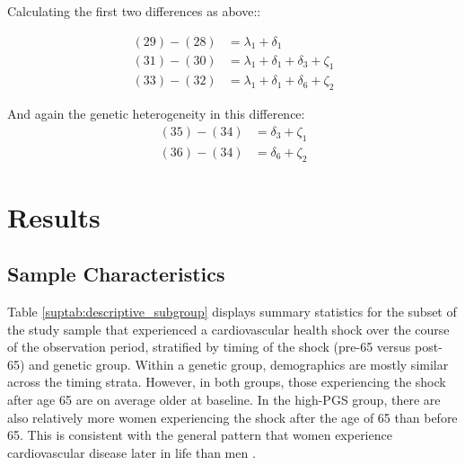 Calculating the first two differences as above::

\begin{align}
(29)-(28)&=\lambda_1+\delta_1\\
(31)-(30)&=\lambda_1+\delta_1+\delta_3+\zeta_1\\
(33)-(32)&=\lambda_1+\delta_1+\delta_6+\zeta_2
\end{align}

And again the genetic heterogeneity in this difference:
\begin{align}
(35)-(34)&=\delta_3+\zeta_1\\
(36)-(34)&=\delta_6+\zeta_2
\end{align}



\section{Results}
\label{supsec:results}

\subsection{Sample Characteristics}
\label{supsec:descriptive}

Table \ref{suptab:descriptive_subgroup} displays summary statistics for the subset of the study sample that experienced a cardiovascular health shock over the course of the observation period, stratified by timing of the shock (pre-65 versus post-65) and genetic group.
Within a genetic group, demographics are mostly similar across the timing strata.
However, in both groups, those experiencing the shock after age 65 are on average older at baseline.
In the high-PGS group, there are also relatively more women experiencing the shock after the age of 65 than before 65.
This is consistent with the general pattern that women experience cardiovascular disease later in life than men \citep{Lloyd-Jones2010}.


